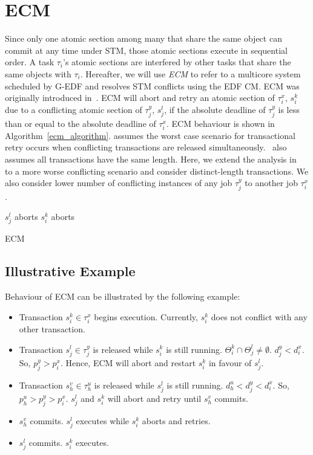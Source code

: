 \section{ECM}
\label{sec:g-edf-edf-cm}
%
Since only one atomic section among many that share the same object can commit at any time under STM, those atomic sections execute in sequential order.  A task $\tau_{i}$'s atomic sections are interfered by other tasks that share the same objects with $\tau_{i}$. Hereafter, we will use \emph{ECM} to refer to a multicore system scheduled by G-EDF and resolves STM conflicts using the EDF CM. ECM was originally introduced in~\cite{6045438}. ECM will abort and retry an atomic section of $\tau_i^x$, $s_i^k$ due to a conflicting atomic section of $\tau_j^y$, $s_j^l$, if the absolute deadline of $\tau_j^y$ is less than or equal to the absolute deadline of $\tau_i^x$. ECM behaviour is shown in Algorithm~\ref{ecm_algorithm}. \cite{6045438} assumes the worst case scenario for transactional retry occurs when conflicting transactions are released simultaneously.~\cite{6045438} also assumes all transactions have the same length. Here, we extend the analysis in~\cite{6045438} to a more worse conflicting scenario and consider distinct-length transactions. We also consider lower number of conflicting instances of any job $\tau_j^y$ to another job $\tau_i^x$.
%
\begin{algorithm}
\footnotesize{
\LinesNumbered
{}
	{$s_j^l$ aborts\label{ecm:step_sicommits}\;}
	{$s_i^k$ aborts\label{ecm:step_siaborts}\;}
	}
\caption{ECM}
\label{ecm_algorithm}
\end{algorithm}
%
\subsection{Illustrative Example}\label{ecm_illustrative_ex}
Behaviour of ECM can be illustrated by the following example:
\begin{itemize}
\item Transaction $s_{i}^{k}\in\tau_{i}^{x}$ begins execution.
Currently, $s_{i}^{k}$ does not conflict with any other transaction.
\item Transaction $s_{j}^{l}\in\tau_{j}^{y}$ is released while
$s_{i}^{k}$ is still running. $\Theta_i^k \cap \Theta_j^l \neq \emptyset$. $d_{j}^{y}<d_{i}^{x}$. So,
$p_{j}^{y}>p_{i}^{x}$. Hence, ECM will abort and restart $s_{i}^{k}$
in favour of $s_{j}^{l}$.
\item Transaction $s_{h}^{v}\in\tau_{h}^{u}$ is released while
$s_{j}^{l}$ is still running. $d_{h}^{u}<d_{j}^{y}<d_{i}^{x}$.
So, $p_{h}^{u}>p_{j}^{y}>p_{i}^{x}$. $s_{j}^{l}$ and $s_{i}^{k}$
will abort and retry until $s_{h}^{v}$ commits.
\item $s_{h}^{v}$ commits. $s_{j}^{l}$ executes while
$s_{i}^{k}$ aborts and retries.
\item $s_{j}^{l}$ commits. $s_{i}^{k}$ executes.
\end{itemize}
%
